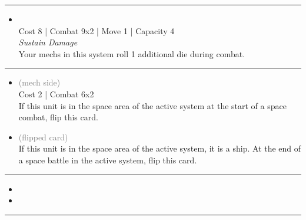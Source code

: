 \begin{multicols}{2}
\vspace{-10pt}\rule{\hsize}{0.4pt}\vspace{5pt}


\begin{itemize}
\item {}\\
Cost 8 | Combat 9x2 | Move 1 | Capacity 4 \\
\emph{Sustain Damage}\\
Your mechs in this system roll 1 additional die during combat.
\end{itemize}

\vspace{-10pt}\rule{\hsize}{0.4pt}\vspace{5pt}


\begin{itemize}
\item {} \textcolor{gray}{(mech side)}
\\
Cost 2 | Combat 6x2 \\
If this unit is in the space area of the active system at the start of a space combat, flip this card.
\item {} \textcolor{gray}{(flipped card)}
\\
If this unit is in the space area of the active system, it is a ship. At the end of a space battle in the active system, flip this card.
\end{itemize}

\vspace{-10pt}\rule{\hsize}{0.4pt}\vspace{5pt}

\nounits

\columnbreak
{}

\begin{itemize}
\item \arcologies
\item \supercharge
\end{itemize}

\vspace{-10pt}\rule{\hsize}{0.4pt}\vspace{5pt}



\end{multicols}
